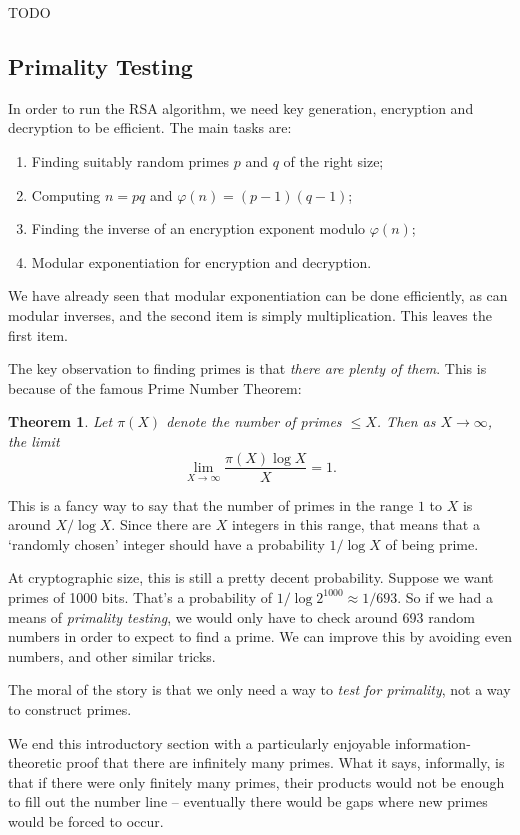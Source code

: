 \documentclass{article}
\theoremstyle{plain}
\newtheorem{theorem}{Theorem}
\theoremstyle{definition}
\theoremstyle{remark}
\numberwithin{theorem}{section}
\begin{document}
TODO

\subsection{Primality Testing}

In order to run the RSA algorithm, we need key generation, encryption and decryption to be efficient.  The main tasks are:
\begin{enumerate}
    \item Finding suitably random primes $p$ and $q$ of the right size;
    \item Computing $n=pq$ and $\varphi(n) = (p-1)(q-1)$;
    \item Finding the inverse of an encryption exponent modulo $\varphi(n)$;
    \item Modular exponentiation for encryption and decryption.
\end{enumerate}

We have already seen that modular exponentiation can be done efficiently, as can modular inverses, and the second item is simply multiplication.  This leaves the first item.

The key observation to finding primes is that \emph{there are plenty of them}.  This is because of the famous Prime Number Theorem:

\begin{theorem}
    Let $\pi(X)$ denote the number of primes $\le X$.  Then as $X \rightarrow \infty$, the limit
    \[
    \lim_{X \rightarrow \infty} \frac{ \pi(X) \log X }{X} = 1.
    \]
\end{theorem}

This is a fancy way to say that the number of primes in the range $1$ to $X$ is around $X/\log X$.  Since there are $X$ integers in this range, that means that a `randomly chosen' integer should have a probability $1/\log X$ of being prime.

At cryptographic size, this is still a pretty decent probability.  Suppose we want primes of 1000 bits.  That's a probability of $1/\log 2^{1000} \approx 1/693$.  So if we had a means of \emph{primality testing}, we would only have to check around 693 random numbers in order to  expect to find a prime.  We can improve this by avoiding even numbers, and other similar tricks.

The moral of the story is that we only need a way to \emph{test for primality}, not a way to construct primes.

We end this introductory section with a particularly enjoyable information-theoretic proof that there are infinitely many primes.  What it says, informally, is that if there were only finitely many primes, their products would not be enough to fill out the number line -- eventually there would be gaps where new primes would be forced to occur.
\end{document}
